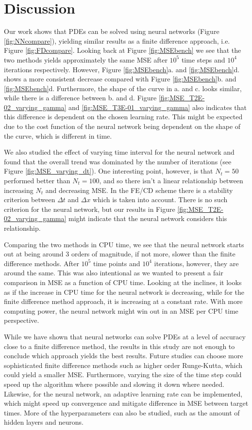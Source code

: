 \section{Discussion}
\label{sec:discussion}

Our work shows that PDEs can be solved using neural networks (Figure \ref{fig:NNcompare}), yielding similar results as a finite difference approach, i.e. Figure \ref{fig:FDcompare}. Looking back at Figure \ref{fig:MSEbench} we see that the two methods yields approximately the same MSE after $10^5$ time steps and $10^4$ iterations respectively. However, Figure \ref{fig:MSEbench}a. and \ref{fig:MSEbench}d. shows a more consistent decrease compared with Figure \ref{fig:MSEbench}b. and \ref{fig:MSEbench}d. Furthermore, the shape of the curve in a. and c. looks similar, while there is a difference between b. and d. Figure \ref{fig:MSE_T2E-02_varying_gamma} and \ref{fig:MSE_T3E-01_varying_gamma} also indicates that this difference is dependent on the chosen learning rate. This might be expected due to the cost function of the neural network being dependent on the shape of the curve, which is different in time.

We also studied the effect of varying time interval for the neural network and found that the overall trend was dominated by the number of iterations (see Figure \ref{fig:MSE_varying_dt}). One interesting point, however, is that $N_t=50$ performed better than $N_t=100$, and so there isn't a linear relationship between increasing $N_t$ and decreasing MSE. In the FE/CD scheme there is a stability criterion between $\Delta t$ and $\Delta x$ which is taken into account. There is no such criterion for the neural network, but our results in Figure \ref{fig:MSE_T2E-02_varying_gamma} might indicate that the neural network considers this relationship.

Comparing the two methods in CPU time, we see that the neural network starts out at being around 3 orders of magnitude, if not more, slower than the finite difference methods. After $10^5$ time points and $10^4$ iterations, however, they are around the same. This was also intentional as we wanted to present a fair comparison in MSE as a function of CPU time. Looking at the inclines, it looks as if the increase in CPU time for the neural network is decreasing, while for the finite difference method approach, it is increasing at a constant rate. With more computing power, the neural network might win out in an MSE per CPU time perspective.

While we have shown that neural networks can solve PDEs at a level of accuracy close to a finite difference method, the results in this study are not enough to conclude which approach yields the best results. Future studies can choose more sophisticated finite difference methods such as higher order Runge-Kutta, which could yield a smaller MSE. Furthermore, varying the size of the time step could speed up the algorithm where possible and slowing it down where needed. Likewise, for the neural network, an adaptive learning rate can be implemented, which might speed up convergence and mitigate difference in MSE between target times. More of the hyperparameters can also be studied, such as the amount of hidden layers and neurons.

